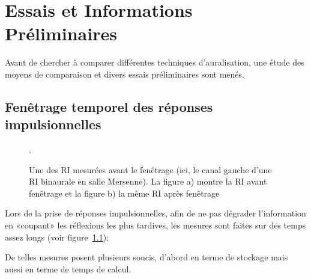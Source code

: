 \chapter{Essais et Informations Préliminaires}

Avant de chercher à comparer différentes techniques d'auralisation, une étude des moyens de comparaison et divers
essais préliminaires sont menés.

%

\section{Fenêtrage temporel des réponses impulsionnelles} %

\begin{figure}[h!]
\caption{\label{ri_non_recoupee}Une des RI mesurées avant le fenêtrage (ici, le canal gauche d'une RI binaurale en salle
Mersenne). La figure a) montre la RI avant fenêtrage et la figure b) la même RI après fenêtrage}.
\end{figure}

Lors de la prise de réponses impulsionnelles, afin de ne pas dégrader l'information en «coupant» les réflexions les plus
tardives, les mesures sont faites sur des temps assez longs (voir figure~\ref{ri_non_recoupee});

De telles mesures posent plusieurs soucis, d'abord en terme de stockage mais aussi en terme de temps de calcul.

